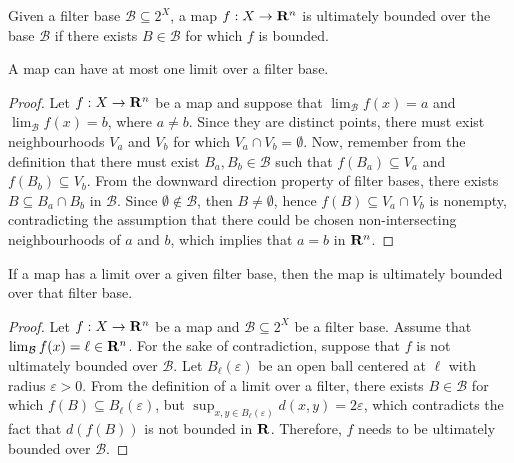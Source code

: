 \begin{definition}\label{def: ulti-bounded-several}
Given a filter base \(\mathcal B \subseteq 2^X\), a map \(f: X \to \mathbf{R}^n\) is
ultimately bounded over the base \(\mathcal B\) if there exists \(B \in
\mathcal B\) for which \(f\) is bounded.
\end{definition}

\begin{proposition}
A map can have at most one limit over a filter base.
\end{proposition}

\begin{proof}
Let \(f: X \to \mathbf{R}^n\) be a map and suppose that \(\lim_\mathcal{B} f(x) = a\)
and \(\lim_\mathcal{B} f(x) = b\), where \(a \neq b\). Since they are distinct
points, there must exist neighbourhoods \(V_a\) and \(V_b\) for which \(V_a
\cap V_b = \emptyset\). Now, remember from the definition that there must
exist \(B_a, B_b \in \mathcal B\) such that \(f(B_a) \subseteq V_a\) and
\(f(B_b) \subseteq V_b\). From the downward direction property of filter
bases, there exists \(B \subseteq B_a \cap B_b\) in \(\mathcal B\). Since
\(\emptyset \not\in \mathcal B\), then \(B \neq \emptyset\), hence \(f(B)
\subseteq V_a \cap V_b\) is nonempty, contradicting the assumption that there
could be chosen non-intersecting neighbourhoods of \(a\) and \(b\), which
implies that \(a = b\) in \(\mathbf{R}^n\).
\end{proof}

\begin{proposition}
If a map has a limit over a given filter base, then the map is ultimately
bounded over that filter base.
\end{proposition}

\begin{proof}
Let \(f: X \to \mathbf{R}^n\) be a map and \(\mathcal B \subseteq 2^X\) be a filter
base. Assume that \(\lim_\mathcal{B} f(x) = \ell \in \mathbf{R}^n\). For the sake of
contradiction, suppose that \(f\) is not ultimately bounded over \(\mathcal
B\). Let \(B_\ell(\varepsilon)\) be an open ball centered at \(\ell\) with
radius \(\varepsilon > 0\). From the definition of a limit over a filter,
there exists \(B \in \mathcal B\) for which \(f(B) \subseteq
B_\ell(\varepsilon)\), but \(\sup_{x, y \in B_\ell(\varepsilon)} d(x, y) = 2
\varepsilon\), which contradicts the fact that \(d(f(B))\) is not bounded in
\(\mathbf{R}\). Therefore, \(f\) needs to be ultimately bounded over \(\mathcal B\).
\end{proof}

